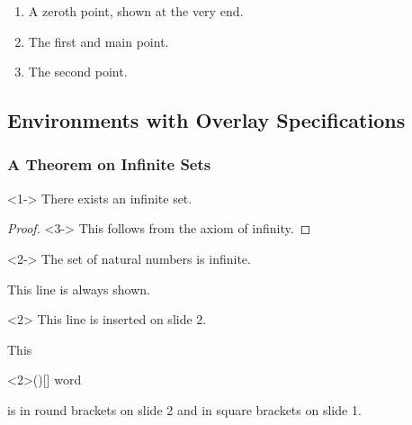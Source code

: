 \begin{frame}
  \begin{enumerate}
  \item<3-| alert@3>[0.] A zeroth point, shown at the very end.
  \item<1-| alert@1> The first and main point.
  \item<2-| alert@2> The second point.
  \end{enumerate}
\end{frame}
\subsection{Environments with Overlay Specifications}
\begin{frame}
  \frametitle{A Theorem on Infinite Sets}
  \begin{theorem}<1->
    There exists an infinite set.
  \end{theorem}
  \begin{proof}<3->
    This follows from the axiom of infinity.
  \end{proof}
  \begin{example}<2->
    The set of natural numbers is infinite.
  \end{example}
\end{frame}
\begin{frame}
  This line is always shown.
  \begin{onlyenv}<2>
    This line is inserted on slide 2.
  \end{onlyenv}
\end{frame}
\begin{frame}
  This
  \begin{altenv}<2>{(}{)}{[}{]}
    word
  \end{altenv}
  is in round brackets on slide 2 and in square brackets on slide 1.
\end{frame}
